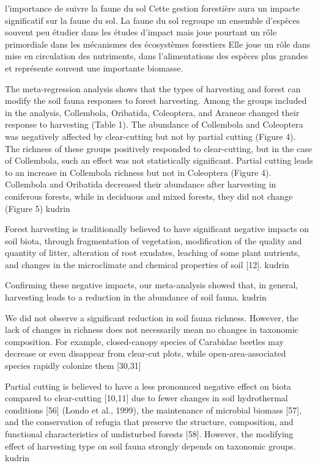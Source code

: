 l'importance de suivre la faune du sol 
    Cette gestion forestière aura un impacte significatif sur la faune du sol.
    La faune du sol regroupe un ensemble d'espèces souvent peu étudier dans les études d'impact mais joue pourtant un rôle primordiale dans les mécanismes des écosystèmes forestiers
    Elle joue un rôle dans mise en circulation des nutriments, dans l'alimentations des espèces plus grandes et représente souvent une importante biomasse.

The meta-regression analysis shows that the types of harvesting and forest can modify the soil fauna responses to forest harvesting. Among the groups included in the analysis, Collembola, Oribatida, Coleoptera, and Araneae changed their response to harvesting (Table 1). The abundance of Collembola and Coleoptera was negatively affected by clear-cutting but not by partial cutting (Figure 4). The richness of these groups positively responded to clear-cutting, but in the case of Collembola, such an effect was not statistically significant. Partial cutting leads to an increase in Collembola richness but not in Coleoptera (Figure 4). Collembola and Oribatida decreased their abundance after harvesting in coniferous forests, while in deciduous and mixed forests, they did not change (Figure 5) kudrin

Forest harvesting is traditionally believed to have significant negative impacts on soil biota, through fragmentation of vegetation, modification of the quality and quantity of litter, alteration of root exudates, leaching of some plant nutrients, and changes in the microclimate and chemical properties of soil [12]. kudrin

Confirming these negative impacts, our meta-analysis showed that, in general, harvesting leads to a reduction in the abundance of soil fauna. kudrin

We did not observe a significant reduction in soil fauna richness. However, the lack of changes in richness does not necessarily mean no changes in taxonomic composition. For example, closed-canopy species of Carabidae beetles may decrease or even disappear from clear-cut plots, while open-area-associated species rapidly colonize them [30,31]

Partial cutting is believed to have a less pronounced negative effect on biota compared to clear-cutting [10,11] due to fewer changes in soil hydrothermal conditions [56] (Londo et al., 1999), the maintenance of microbial biomass [57], and the conservation of refugia that preserve the structure, composition, and functional characteristics of undisturbed forests [58]. However, the modifying effect of harvesting type on soil fauna strongly depends on taxonomic groups. kudrin

